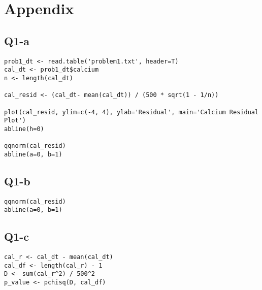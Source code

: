 \documentclass[11pt,letterpaper]{article}
\begin{document}
\section*{Appendix}
\subsection*{Q1-a}
\begin{verbatim}
prob1_dt <- read.table('problem1.txt', header=T)
cal_dt <- prob1_dt$calcium
n <- length(cal_dt)

cal_resid <- (cal_dt- mean(cal_dt)) / (500 * sqrt(1 - 1/n))

plot(cal_resid, ylim=c(-4, 4), ylab='Residual', main='Calcium Residual Plot')
abline(h=0)

qqnorm(cal_resid)
abline(a=0, b=1)
\end{verbatim}

\subsection*{Q1-b}
\begin{verbatim}
qqnorm(cal_resid)
abline(a=0, b=1)
\end{verbatim}

\subsection*{Q1-c}
\begin{verbatim}
cal_r <- cal_dt - mean(cal_dt)
cal_df <- length(cal_r) - 1
D <- sum(cal_r^2) / 500^2
p_value <- pchisq(D, cal_df)
\end{verbatim}
\end{document}
